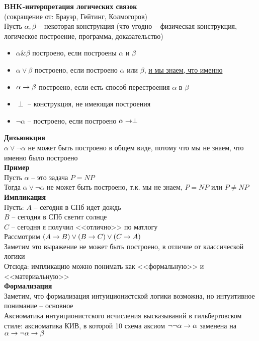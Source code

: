 \documentclass[12pt]{article}
\begin{document}
\textbf{BHK-интерпретация логических связок}\\
(сокращение от: Брауэр, Гейтинг, Колмогоров)\\
Пусть $\alpha, \beta$ -- некоторая конструкция (что угодно -- физическая конструкция, логическое построение, программа, доказательство)\\
\begin{itemize}
    \item $\alpha \& \beta$ построено, если построены $\alpha$ и $\beta$
    \item $\alpha \lor \beta$ построено, если построено $\alpha$ или $\beta$, \underline{и мы знаем, что именно}
    \item $\alpha \rightarrow \beta$ построено, если есть способ перестроения $\alpha$ в $\beta$
    \item $\perp$ -- конструкция, не имеющая построения
    \item $\lnot \alpha$ -- построено, если построено $\alpha \rightarrow \perp$
\end{itemize}
\textbf{Дизъюнкция}\\
$\alpha \lor \lnot \alpha$ не может быть построено в общем виде, потому что мы не знаем, что именно было построено\\
\textbf{Пример}\\
Пусть $\alpha$ -- это задача $P = NP$\\
Тогда $\alpha \lor \lnot \alpha$ не может быть построено, т.к. мы не знаем, $P=NP$ или $P\neq NP$\\
\textbf{Импликация}\\
Пусть:
$A$ -- сегодня в СПб идет дождь\\
$B$ -- сегодня в СПб светит солнце\\
$C$ -- сегодня я получил <<отлично>> по матлогу\\
Рассмотрим $(A \rightarrow B) \lor (B \rightarrow C) \lor (C \rightarrow A)$\\
Заметим это выражение не может быть построено, в отличие от классической логики\\
Отсюда: импликацию можно понимать как <<формальную>> и <<материальную>>\\
\textbf{Формализация}\\
Заметим, что формализация интуиционистской логики возможна, но интуитивное понимание -- основное\\
Аксиоматика интуиционистского исчисления высказываний в гильбертовском стиле: аксиоматика КИВ, в которой 10 схема аксиом $\lnot\lnot \alpha\rightarrow \alpha$ заменена на $\alpha \rightarrow \lnot \alpha \rightarrow \beta$
\end{document}

